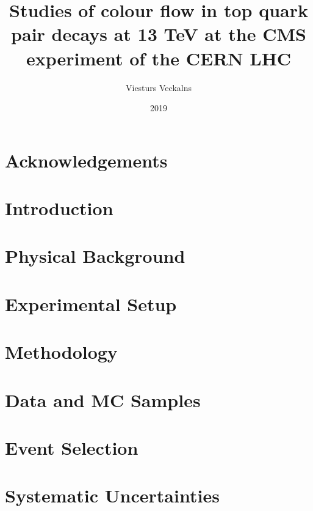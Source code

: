 \documentclass[titlepage, a4paper, EN]{mythesis}
\title{Studies of colour flow in top quark pair decays at 13 TeV at the CMS experiment of the CERN LHC}
\author{Viesturs Veckalns}
\date{2019}
\begin{document}
\maketitle
\begin{abstract}
        
\end{abstract}

\chapter*{Acknowledgements}
\label{chap:acknowledgements}


\tableofcontents
\listoffigures
\listoftables

\chapter{Introduction}
\label{chap:introduction}


\chapter{Physical Background}


\chapter{Experimental Setup}


\chapter{Methodology}
\label{chap:methodology}


\chapter{Data and MC Samples}
\label{chap:data_and_mc_samples}


\chapter{Event Selection}
\label{chap:event_selection}


\chapter{Systematic Uncertainties}
\label{chap:systematic_uncertainties}

\end{document}
